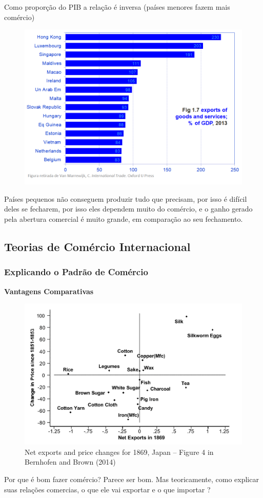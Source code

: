 \documentclass[a4paper,12pt]{article}[abntex2]
\begin{document}
Como proporção do PIB a relação é inversa (países menores fazem mais comércio)
\begin{figure}[H]
    \centering
    \includegraphics[width=0.70\linewidth]{Imagens/a1i16.png}
\end{figure}
Países pequenos não conseguem produzir tudo que precisam, por isso é difícil deles se fecharem, por isso eles dependem muito do comércio, e o ganho gerado pela abertura comercial é muito grande, em comparação ao seu fechamento.

\subsection{\textbf{Teorias de Comércio Internacional}}
\subsubsection{\textbf{Explicando o Padrão de Comércio}}
\textbf{Vantagens Comparativas}

\begin{figure}[H]
    \centering
     \caption{Net exports and price changes for 1869, Japan – Figure 4 in Bernhofen and Brown (2014)}
    \includegraphics[width=0.70\linewidth]{Imagens/a1i10.png}
\end{figure}
Por que é bom fazer comércio? Parece ser bom. Mas teoricamente, como explicar suas relações comercias, o que ele vai exportar e o que importar ?
\end{document}
